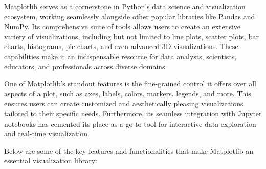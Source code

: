 Matplotlib serves as a cornerstone in Python’s data science and visualization ecosystem, working seamlessly alongside other popular libraries like Pandas and NumPy. Its comprehensive suite of tools allows users to create an extensive variety of visualizations, including but not limited to line plots, scatter plots, bar charts, histograms, pie charts, and even advanced 3D visualizations. These capabilities make it an indispensable resource for data analysts, scientists, educators, and professionals across diverse domains.

One of Matplotlib's standout features is the fine-grained control it offers over all aspects of a plot, such as axes, labels, colors, markers, legends, and more. This ensures users can create customized and aesthetically pleasing visualizations tailored to their specific needs. Furthermore, its seamless integration with Jupyter notebooks has cemented its place as a go-to tool for interactive data exploration and real-time visualization.

Below are some of the key features and functionalities that make Matplotlib an essential visualization library:

